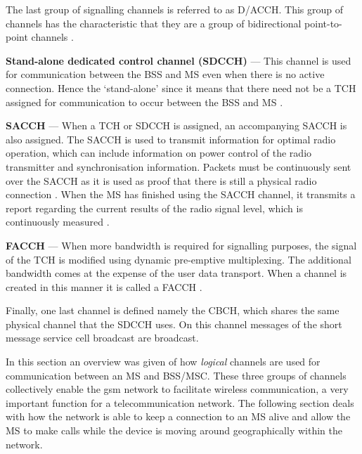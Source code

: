The last group of signalling channels is referred to as \gls{D/ACCH}. This group of channels has the characteristic that they are a group of bidirectional point-to-point channels \cite{GSMArchitectureProtocolsServices}.
\begin{description}
  \item{\textbf{Stand-alone dedicated control channel (\gls{SDCCH})}} --- This channel is used for communication between the \gls{BSS} and \gls{MS} even when there is no active connection\cite{GSMArchitectureProtocolsServices}. Hence the `stand-alone' since it means that there need not be a \gls{TCH} assigned for communication to occur between the \gls{BSS} and \gls{MS} \cite{GSMArchitectureProtocolsServices}.
  \item{\textbf{\Gls{SACCH}}} --- When a \gls{TCH} or \gls{SDCCH} is assigned, an accompanying \gls{SACCH} is also assigned. The \gls{SACCH} is used to transmit information for optimal radio operation, which can include information on power control of the radio transmitter and synchronisation information\cite{GSMArchitectureProtocolsServices}. Packets must be continuously sent over the \gls{SACCH} as it is used as proof that there is still a physical radio connection \cite{GSMArchitectureProtocolsServices}. When the \gls{MS} has finished using the \gls{SACCH} channel, it transmits a report regarding the current results of the radio signal level, which is continuously measured \cite{GSMArchitectureProtocolsServices}.
  \item{\textbf{\Gls{FACCH}}} --- When more bandwidth is required for signalling purposes, the signal of the \gls{TCH} is modified using dynamic pre-emptive multiplexing. The additional bandwidth comes at the expense of the user data transport\cite{GSMArchitectureProtocolsServices}. When a channel is created in this manner it is called a \gls{FACCH} \cite{GSMArchitectureProtocolsServices}.
\end{description}

Finally, one last channel is defined namely the \gls{CBCH}, which shares the same physical channel that the \gls{SDCCH} uses. On this channel messages of the short message service cell broadcast are broadcast\cite{GSMArchitectureProtocolsServices}.

In this section an overview was given of how \emph{logical} channels are used for communication between an \gls{MS}  and \gls{BSS}/\gls{MSC}\@. These three groups of channels collectively enable the \gls{gsm} network to facilitate wireless communication, a very important function for a telecommunication network. The following section deals with how the network is able to keep a connection to an \gls{MS} alive and allow the \gls{MS} to make calls while the device is moving around geographically within the network.
